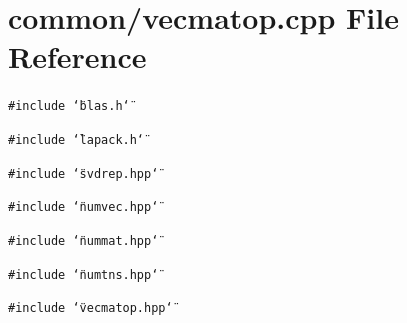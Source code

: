 \section{common/vecmatop.cpp File Reference}
\label{vecmatop_8cpp}


{\tt \#include \char`\"{}blas.h\char`\"{}}\par
{\tt \#include \char`\"{}lapack.h\char`\"{}}\par
{\tt \#include \char`\"{}svdrep.hpp\char`\"{}}\par
{\tt \#include \char`\"{}numvec.hpp\char`\"{}}\par
{\tt \#include \char`\"{}nummat.hpp\char`\"{}}\par
{\tt \#include \char`\"{}numtns.hpp\char`\"{}}\par
{\tt \#include \char`\"{}vecmatop.hpp\char`\"{}}\par
